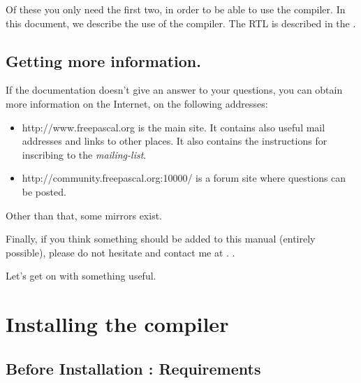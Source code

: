 Of these you only need the first two, in order to be able to use the compiler.
In this document, we describe the use of the compiler. The RTL is described in the
.

\section{Getting more information.}
If the documentation doesn't give an answer to your questions,
you can obtain more information on the Internet, on the following addresses:
\begin{itemize}
\item
{}
{http://www.freepascal.org} is the main
site. It contains also useful mail addresses and
links to other places.
It also contains the instructions for inscribing to the
\textit{mailing-list}.

\item
{}
{http://community.freepascal.org:10000/} is a forum site where
questions can be posted.
\end{itemize}
Other than that, some mirrors exist.

Finally, if you think something should be added to this manual
(entirely possible), please do not hesitate and contact me at
.
.

Let's get on with something useful.


\chapter{Installing the compiler}
\label{ch:Installation}

\section{Before Installation : Requirements}

%
%
